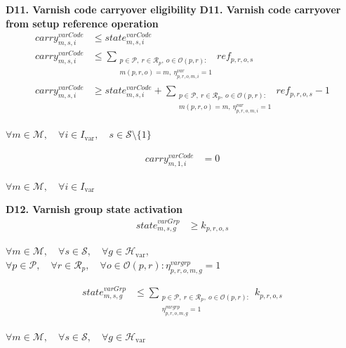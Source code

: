\documentclass{article}
\begin{document}
\noindent\textbf{D11. Varnish code carryover eligibility}
\noindent\textbf{D11. Varnish code carryover from setup reference operation}
\begin{align}
carry^{varCode}_{m,s,i}
&\le
state^{varCode}_{m,s,i}
\label{eq:D11_var_code_carry_current_state}
\\
carry^{varCode}_{m,s,i}
&\le
\sum_{\substack{
p \in \mathcal{P},\ r \in \mathcal{R}_p,\ o \in \mathcal{O}(p,r):\\
m(p,r,o)=m,\ \eta^{var}_{p,r,o,m,i}=1
}}
ref_{p,r,o,s}
\label{eq:D11_var_code_carry_reference_ub}
\\
carry^{varCode}_{m,s,i}
&\ge
state^{varCode}_{m,s,i}
+
\sum_{\substack{
p \in \mathcal{P},\ r \in \mathcal{R}_p,\ o \in \mathcal{O}(p,r):\\
m(p,r,o)=m,\ \eta^{var}_{p,r,o,m,i}=1
}}
ref_{p,r,o,s}
- 1
\label{eq:D11_var_code_carry_reference_lb}
\end{align}
\begin{center}
$\forall m \in \mathcal{M}, \quad
\forall i \in I_{\text{var}}, \quad
s \in \mathcal{S}\setminus\{1\}$
\end{center}

\begin{align}
carry^{varCode}_{m,1,i}
&=
0
\label{eq:D11_var_code_carry_initial}
\end{align}
\begin{center}
$\forall m \in \mathcal{M}, \quad
\forall i \in I_{\text{var}}$
\end{center}
\noindent\textbf{D12. Varnish group state activation}
\begin{align}
state^{varGrp}_{m,s,g}
&\ge
k_{p,r,o,s}
\label{eq:D12_var_group_state_lb}
\end{align}
\begin{center}
$\forall m \in \mathcal{M}, \quad
\forall s \in \mathcal{S}, \quad
\forall g \in \mathcal{H}_{\text{var}},$
\\
$\forall p \in \mathcal{P}, \quad
\forall r \in \mathcal{R}_p, \quad
\forall o \in \mathcal{O}(p,r):
\eta^{vargrp}_{p,r,o,m,g}=1$
\end{center}

\begin{align}
state^{varGrp}_{m,s,g}
&\le
\sum_{\substack{
p \in \mathcal{P},\ r \in \mathcal{R}_p,\ o \in \mathcal{O}(p,r):\\
\eta^{vargrp}_{p,r,o,m,g}=1
}}
k_{p,r,o,s}
\label{eq:D12_var_group_state_ub}
\end{align}
\begin{center}
$\forall m \in \mathcal{M}, \quad
\forall s \in \mathcal{S}, \quad
\forall g \in \mathcal{H}_{\text{var}}$
\end{center}
\end{document}
